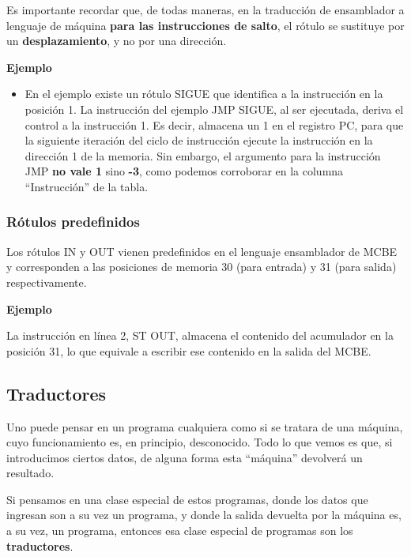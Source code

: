 \documentclass[spanish,A4,]{article}
\begin{document}
Es importante recordar que, de todas maneras, en la traducción de
ensamblador a lenguaje de máquina \textbf{para las instrucciones de
salto}, el rótulo se sustituye por un \textbf{desplazamiento}, y no por
una dirección.

\textbf{Ejemplo}

\begin{itemize}
\itemsep1pt\parskip0pt
\item
  En el ejemplo existe un rótulo SIGUE que identifica a la instrucción
  en la posición 1. La instrucción del ejemplo JMP SIGUE, al ser
  ejecutada, deriva el control a la instrucción 1. Es decir, almacena un
  1 en el registro PC, para que la siguiente iteración del ciclo de
  instrucción ejecute la instrucción en la dirección 1 de la memoria.
  Sin embargo, el argumento para la instrucción JMP \textbf{no vale 1}
  sino \textbf{-3}, como podemos corroborar en la columna
  ``Instrucción'' de la tabla.
\end{itemize}

\subsubsection{Rótulos predefinidos}\label{ruxf3tulos-predefinidos}

Los rótulos IN y OUT vienen predefinidos en el lenguaje ensamblador de
MCBE y corresponden a las posiciones de memoria 30 (para entrada) y 31
(para salida) respectivamente.

\textbf{Ejemplo}

La instrucción en línea 2, ST OUT, almacena el contenido del acumulador
en la posición 31, lo que equivale a escribir ese contenido en la salida
del MCBE.

\subsection{Traductores}\label{traductores}

Uno puede pensar en un programa cualquiera como si se tratara de una
máquina, cuyo funcionamiento es, en principio, desconocido. Todo lo que
vemos es que, si introducimos ciertos datos, de alguna forma esta
``máquina'' devolverá un resultado.

Si pensamos en una clase especial de estos programas, donde los datos
que ingresan son a su vez un programa, y donde la salida devuelta por la
máquina es, a su vez, un programa, entonces esa clase especial de
programas son los \textbf{traductores}.
\end{document}
